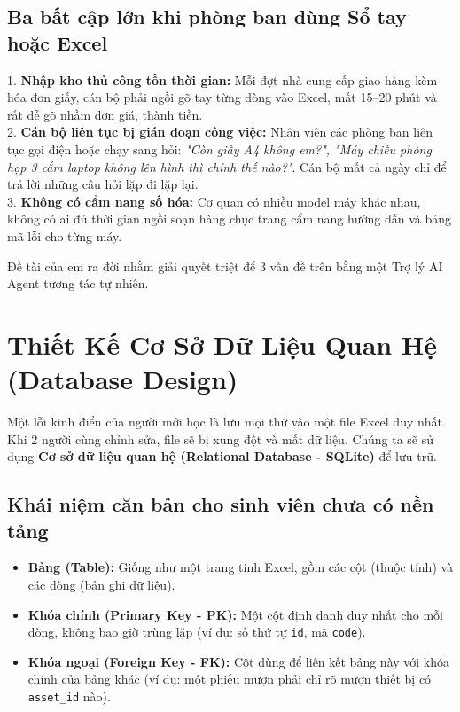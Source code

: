 \documentclass[11pt,a4paper]{article}
\begin{document}
\subsection{Ba bất cập lớn khi phòng ban dùng Sổ tay hoặc Excel}

\begin{notebox}
1. \textbf{Nhập kho thủ công tốn thời gian:} Mỗi đợt nhà cung cấp giao hàng kèm hóa đơn giấy, cán bộ phải ngồi gõ tay từng dòng vào Excel, mất 15--20 phút và rất dễ gõ nhầm đơn giá, thành tiền.\\
2. \textbf{Cán bộ liên tục bị gián đoạn công việc:} Nhân viên các phòng ban liên tục gọi điện hoặc chạy sang hỏi: \textit{"Còn giấy A4 không em?", "Máy chiếu phòng họp 3 cắm laptop không lên hình thì chỉnh thế nào?"}. Cán bộ mất cả ngày chỉ để trả lời những câu hỏi lặp đi lặp lại.\\
3. \textbf{Không có cẩm nang số hóa:} Cơ quan có nhiều model máy khác nhau, không có ai đủ thời gian ngồi soạn hàng chục trang cẩm nang hướng dẫn và bảng mã lỗi cho từng máy.
\end{notebox}

Đề tài của em ra đời nhằm giải quyết triệt để 3 vấn đề trên bằng một Trợ lý AI Agent tương tác tự nhiên.

\section{Thiết Kế Cơ Sở Dữ Liệu Quan Hệ (Database Design)}

Một lỗi kinh điển của người mới học là lưu mọi thứ vào một file Excel duy nhất. Khi 2 người cùng chỉnh sửa, file sẽ bị xung đột và mất dữ liệu. Chúng ta sẽ sử dụng \textbf{Cơ sở dữ liệu quan hệ (Relational Database - SQLite)} để lưu trữ.

\subsection{Khái niệm căn bản cho sinh viên chưa có nền tảng}
\begin{itemize}
    \item \textbf{Bảng (Table):} Giống như một trang tính Excel, gồm các cột (thuộc tính) và các dòng (bản ghi dữ liệu).
    \item \textbf{Khóa chính (Primary Key - PK):} Một cột định danh duy nhất cho mỗi dòng, không bao giờ trùng lặp (ví dụ: số thứ tự \texttt{id}, mã \texttt{code}).
    \item \textbf{Khóa ngoại (Foreign Key - FK):} Cột dùng để liên kết bảng này với khóa chính của bảng khác (ví dụ: một phiếu mượn phải chỉ rõ mượn thiết bị có \texttt{asset\_id} nào).
\end{itemize}
\end{document}
